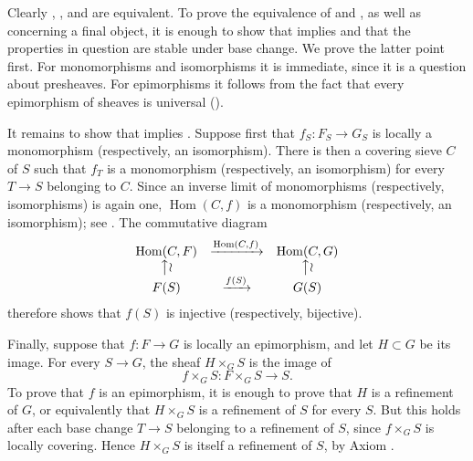 Clearly , , and  are equivalent. To prove the equivalence of
 and , as well as  concerning a final object, it is
enough to show that  implies  and that the properties in question
are stable under base change. We prove the latter point first. For
monomorphisms and isomorphisms it is immediate, since it is a question
about presheaves. For epimorphisms it follows from the fact that every
epimorphism of sheaves is universal ().

It remains to show that  implies . Suppose first that
\(f_S:F_S\to G_S\) is locally a monomorphism (respectively, an
isomorphism). There is then a covering sieve \(C\) of \(S\) such that
\(f_T\) is a monomorphism (respectively, an isomorphism) for every
\(T\to S\) belonging to \(C\). Since an inverse limit of monomorphisms
(respectively, isomorphisms) is again one,
\(\operatorname{Hom}(C,f)\) is a monomorphism (respectively, an
isomorphism); see . The commutative diagram
\[
\begin{array}{ccc}
 \operatorname{Hom}(C,F)
 &\xrightarrow{\operatorname{Hom}(C,f)}&
 \operatorname{Hom}(C,G)
 \\
 \big\uparrow\wr && \big\uparrow\wr
 \\
 F(S)&\xrightarrow{f(S)}&G(S)
\end{array}
\]
therefore shows that \(f(S)\) is injective (respectively, bijective).

Finally, suppose that \(f:F\to G\) is locally an epimorphism, and let
\(H\subset G\) be its image. For every \(S\to G\), the sheaf
\(H\times_GS\) is the image of
\[
  f\times_GS:F\times_GS\longrightarrow S.
\]
To prove that \(f\) is an epimorphism, it is enough to prove that \(H\) is
a refinement of \(G\), or equivalently that \(H\times_GS\) is a
refinement of \(S\) for every \(S\). But this holds after each base change
\(T\to S\) belonging to a refinement of \(S\), since
\(f\times_GS\) is locally covering. Hence \(H\times_GS\) is itself a
refinement of \(S\), by Axiom .

